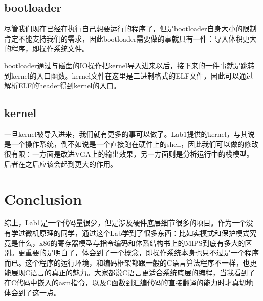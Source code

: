 \documentclass[a4paper,12pt]{article}
\begin{document}
\subsection{bootloader}

尽管我们现在已经在执行自己想要运行的程序了，但是bootloader自身大小的限制肯定不能支持我们的需求，因此bootloader需要做的事就只有一件：导入体积更大的程序，即操作系统文件。

bootloader通过与磁盘的IO操作把kernel导入进来以后，接下来的一件事就是跳转到kernel的入口函数。kernel文件在这里是二进制格式的ELF文件，因此可以通过解析ELF的header得到kernel的入口。

\subsection{kernel}

一旦kernel被导入进来，我们就有更多的事可以做了。Lab1提供的kernel，与其说是一个操作系统，倒不如说是一个直接跑在硬件上的shell，因此我们可以做的修改很有限：一方面是改进VGA上的输出效果，另一方面则是分析运行中的栈模型。后者在之后应该会起到更大的作用。

\newpage


\section{Conclusion}

综上，Lab1是一个代码量很少，但是涉及硬件底层细节很多的项目。作为一个没有学过微机原理的同学，通过这个Lab学到了很多东西：比如实模式和保护模式究竟是什么，x86的寄存器模型与指令编码和体系结构书上的MIPS到底有多大的区别。更重要的是明白了，体会到了一个概念，即操作系统本身也只不过是一个程序而已。这个程序的运行环境，和编码框架都跟一般的C语言算法程序不一样，也更能展现C语言的真正的魅力。大家都说C语言更适合系统底层的编程，当我看到了在C代码中嵌入的asm指令，以及C函数到汇编代码的直接翻译的能力时才真切地体会到了这一点。
\end{document}
